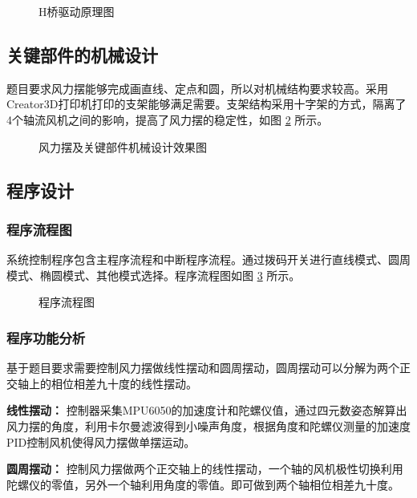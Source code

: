 \documentclass[zihao=-4,fontset=none]{ctexart}
\begin{document}
\begin{figure}[H]
    \centering
    \caption{H桥驱动原理图}
    \label{fig:hbridge}
\end{figure}

\subsection{关键部件的机械设计}

题目要求风力摆能够完成画直线、定点和圆，所以对机械结构要求较高。采用Creator3D打印机打印的支架能够满足需要。支架结构采用十字架的方式，隔离了4个轴流风机之间的影响，提高了风力摆的稳定性，如图 \ref{fig:mech} 所示。

\begin{figure}[H]
    \centering
    \caption{风力摆及关键部件机械设计效果图}
    \label{fig:mech}
\end{figure}

\subsection{程序设计}

\subsubsection{程序流程图}

系统控制程序包含主程序流程和中断程序流程。通过拨码开关进行直线模式、圆周模式、椭圆模式、其他模式选择。程序流程图如图 \ref{fig:flow} 所示。

\begin{figure}[H]
    \centering
    \caption{程序流程图}
    \label{fig:flow}
\end{figure}

\subsubsection{程序功能分析}

基于题目要求需要控制风力摆做线性摆动和圆周摆动，圆周摆动可以分解为两个正交轴上的相位相差九十度的线性摆动。

\textbf{线性摆动：} 控制器采集MPU6050的加速度计和陀螺仪值，通过四元数姿态解算出风力摆的角度，利用卡尔曼滤波得到小噪声角度，根据角度和陀螺仪测量的加速度PID控制风机使得风力摆做单摆运动。

\textbf{圆周摆动：} 控制风力摆做两个正交轴上的线性摆动，一个轴的风机极性切换利用陀螺仪的零值，另外一个轴利用角度的零值。即可做到两个轴相位相差九十度。
\end{document}

